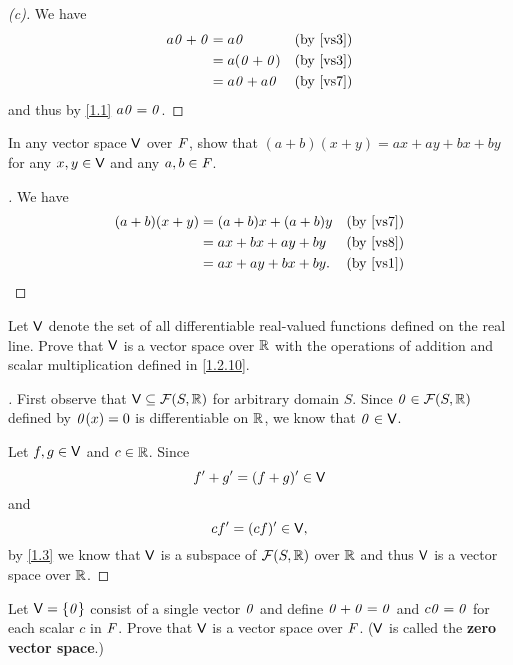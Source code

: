 \begin{proof}[(c)]
	We have
	\begin{align*}
		a\mathit{0} + \mathit{0} & = a\mathit{0}         &  & \text{(by \ref{vs3})} \\
		           & = a(\mathit{0} + \mathit{0}) &  & \text{(by \ref{vs3})} \\
		           & = a\mathit{0} + a\mathit{0}  &  & \text{(by \ref{vs7})}
	\end{align*}
	and thus by \cref{1.1} \(a\mathit{0} = \mathit{0}\).
\end{proof}

\exercisesection

\setcounter{ex}{7}
\begin{ex}\label{ex:1.2.8}
	In any vector space \(\mathsf{V}\) over \(\mathit{F}\), show that \((a + b)(x + y) = ax + ay + bx + by\) for any \(x, y \in \mathsf{V}\) and any \(a, b \in \mathit{F}\).
\end{ex}

\begin{proof}[]
	We have
	\begin{align*}
		(a + b)(x + y) & = (a + b) x + (a + b) y &  & \text{(by \ref{vs7})} \\
		               & = ax + bx + ay + by     &  & \text{(by \ref{vs8})} \\
		               & = ax + ay + bx + by.    &  & \text{(by \ref{vs1})}
	\end{align*}
\end{proof}

\setcounter{ex}{9}
\begin{ex}\label{ex:1.2.10}
	Let \(\mathsf{V}\) denote the set of all differentiable real-valued functions defined on the real line.
	Prove that \(\mathsf{V}\) is a vector space over \(\mathbb{R}\) with the operations of addition and scalar multiplication defined in \cref{1.2.10}.
\end{ex}

\begin{proof}[]
	First observe that \(\mathsf{V} \subseteq \mathcal{F}(S, \mathbb{R})\) for arbitrary domain \(S\).
	Since \(\mathit{0} \in \mathcal{F}(S, \mathbb{R})\) defined by \(\mathit{0}(x) = 0\) is differentiable on \(\mathbb{R}\), we know that \(\mathit{0} \in \mathsf{V}\).

	Let \(f, g \in \mathsf{V}\) and \(c \in \mathbb{R}\).
	Since
	\[
		f' + g' = (f + g)' \in \mathsf{V}
	\]
	and
	\[
		cf' = (cf)' \in \mathsf{V},
	\]
	by \cref{1.3} we know that \(\mathsf{V}\) is a subspace of \(\mathcal{F}(S, \mathbb{R})\) over \(\mathbb{R}\) and thus \(\mathsf{V}\) is a vector space over \(\mathbb{R}\).
\end{proof}

\begin{ex}\label{ex:1.2.11}
	Let \(\mathsf{V} = \left\lbrace\mathit{0}\right\rbrace\) consist of a single vector \(\mathit{0}\) and define \(\mathit{0} + \mathit{0} = \mathit{0}\) and \(c\mathit{0} = \mathit{0}\) for each scalar \(c\) in \(\mathit{F}\).
	Prove that \(\mathsf{V}\) is a vector space over \(\mathit{F}\).
	(\(\mathsf{V}\) is called the \textbf{zero vector space}.)
\end{ex}

